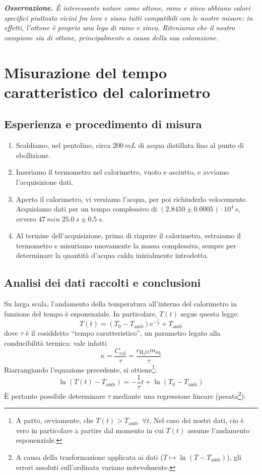 \documentclass{article}
\newcommand*{\acqua}{{\text{H}_2\text{O}}}
\begin{document}
\emph{
    \textbf{Osservazione.}
    È interessante notare come ottone, rame e zinco abbiano calori specifici piuttosto vicini
    fra loro e siano tutti compatibili con le nostre misure: in effetti, l'ottone è proprio
    una lega di rame e zinco. Riteniamo che il nostro campione sia di ottone, principalmente
    a causa della sua colorazione.
}

\section{Misurazione del tempo caratteristico del calorimetro}

\subsection{Esperienza e procedimento di misura}

\begin{enumerate}
    \item
        Scaldiamo, nel pentolino, circa $\qty{200}{mL}$ di acqua distillata
        fino al punto di ebollizione.
    \item
        Inseriamo il termometro nel calorimetro, vuoto e asciutto, e avviamo
        l'acquisizione dati.
    \item
        Aperto il calorimetro, vi versiamo l'acqua, per poi richiuderlo velocemente.
        Acquisiamo dati per un tempo complessivo di
        $\left(2.8450\pm0.0005\right)\cdot10^4\,\unit{s}$, ovvero
        $\qty{47}{min}\;\qty{25.0}{s}\pm\qty{0.5}{s}$.
    \item
        Al termine dell'acquisizione, prima di riaprire il calorimetro, estraiamo
        il termometro e misuriamo nuovamente la massa complessiva, sempre per
        determinare la quantità d'acqua calda inizialmente introdotta.
\end{enumerate}

\subsection{Analisi dei dati raccolti e conclusioni}
Su larga scala, l'andamento della temperatura all'interno del calorimetro
in funzione del tempo è esponenziale. In particolare, $T(t)$ segue questa
legge:
\[
    T(t) = (T_0 - T_\text{amb}) e^{-\frac{t}{\tau}} + T_\text{amb}
\]
dove $\tau$ è il cosiddetto “tempo caratteristico”, un parametro legato
alla conducibilità termica: vale infatti
\[\kappa = \frac{C_\text{cal}}{\tau} = \frac{c_\acqua m_\text{eq}}{\tau}\]
Riarrangiando l'equazione precedente, si ottiene\footnote{
    A patto, ovviamente, che $T(t) > T_\text{amb}\;\;\forall t$.
    Nel caso dei nostri dati, cio è vero in particolare
    a partire dal momento in cui $T(t)$ assume l'andamento
    esponenziale.
}:
\[
    \ln(T(t) - T_\text{amb}) = -\frac{1}{\tau} t + \ln(T_0 - T_\text{amb})
\]
È pertanto possibile determinare $\tau$ mediante una regressione lineare (pesata\footnote{
    A causa della trasformazione applicata ai dati ($T \longmapsto \ln(T - T_\text{amb})$),
    gli errori assoluti sull'ordinata variano notevolmente.
}):
\end{document}
